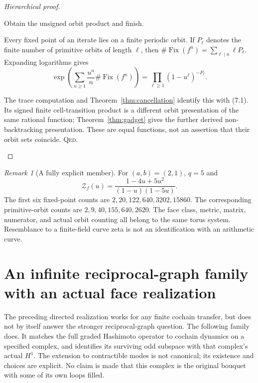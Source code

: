 \documentclass[11pt,a4paper]{article}
\theoremstyle{remark}\newtheorem{remark}[definition]{Remark}
\newcommand{\QED}{\textsc{Qed}}
\begin{document}
\begin{proof}[Hierarchical proof]
\begin{steps}
\item Obtain the unsigned orbit product and finish.
\begin{steps}
\item Every fixed point of an iterate lies on a finite periodic orbit. If $P_\ell$ denotes the finite number of primitive orbits of length $\ell$, then $\#\operatorname{Fix}(f^n)=\sum_{\ell\mid n}\ell P_\ell$. Expanding logarithms gives
\[
\exp\left(\sum_{n\ge1}\frac{u^n}{n}\#\operatorname{Fix}(f^n)\right)
=\prod_{\ell\ge1}(1-u^\ell)^{-P_\ell}.
\]
\item The trace computation and Theorem~\ref{thm:cancellation} identify this with (7.1). Its signed finite cell-transition product is a different orbit presentation of the same rational function; Theorem~\ref{thm:gadget} gives the further derived non-backtracking presentation. These are equal functions, not an assertion that their orbit sets coincide. \QED.
\end{steps}
\end{steps}
\end{proof}

\begin{remark}[A fully explicit member]
For $(a,b)=(2,1)$, $q=5$ and
\[
\mathcal Z_f(u)=\frac{1-4u+5u^2}{(1-u)(1-5u)}.
\]
The first six fixed-point counts are $2,20,122,640,3202,15860$. The corresponding primitive-orbit counts are $2,9,40,155,640,2620$. The face class, metric, matrix, numerator, and actual orbit counting all belong to the same torus system. Resemblance to a finite-field curve zeta is not an identification with an arithmetic curve.
\end{remark}

\section{An infinite reciprocal-graph family with an actual face realization}\label{sec:bouquet}

The preceding directed realization works for any finite cochain transfer, but does not by itself answer the stronger reciprocal-graph question. The following family does. It matches the full graded Hashimoto operator to cochain dynamics on a specified complex, and identifies its surviving odd subspace with that complex's actual $H^1$. The extension to contractible modes is not canonical; its existence and choices are explicit. No claim is made that this complex is the original bouquet with some of its own loops filled.
\end{document}
